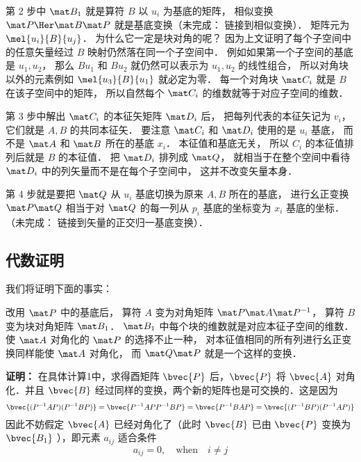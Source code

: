 第 2 步中 $\mat B_1$ 就是算符 $B$ 以 $u_i$ 为基底的矩阵， 相似变换 $\mat P\Her \mat B\mat P$ 就是基底变换（未完成： 链接到相似变换）． 矩阵元为 $\mel{u_i}{B}{u_j}$． 为什么它一定是块对角的呢？ 因为上文证明了每个子空间中的任意矢量经过 $B$ 映射仍然落在同一个子空间中． 例如如果第一个子空间的基底是 $u_1, u_2$， 那么 $B u_1$ 和 $B u_2$ 就仍然可以表示为 $u_1, u_2$ 的线性组合， 所以对角块以外的元素例如 $\mel{u_3}{B}{u_1}$ 就必定为零． 每一个对角块 $\mat C_i$ 就是 $B$ 在该子空间中的矩阵， 所以自然每个 $\mat C_i$ 的维数就等于对应子空间的维数．

第 3 步中解出 $\mat C_i$ 的本征矢矩阵 $\mat D_i$ 后， 把每列代表的本征矢记为 $v_i$， 它们就是 $A, B$ 的共同本征矢． 要注意 $\mat C_i$ 和 $\mat D_i$ 使用的是 $u_i$ 基底， 而不是 $\mat A$ 和 $\mat B$ 所在的基底 $x_i$． 本征值和基底无关， 所以 $C_i$ 的本征值排列后就是 $B$ 的本征值． 把 $\mat D_i$ 排列成 $\mat Q$， 就相当于在整个空间中看待 $\mat D_i$ 中的列矢量而不是在每个子空间中， 这并不改变矢量本身．

第 4 步就是要把 $\mat Q$ 从 $u_i$ 基底切换为原来 $A, B$ 所在的基底， 进行幺正变换 $\mat P\mat Q$ 相当于对 $\mat Q$ 的每一列从 $p_i$ 基底的坐标变为 $x_i$ 基底的坐标．（未完成： 链接到矢量的正交归一基底变换）．


\subsection{代数证明}
我们将证明下面的事实：

改用 $\mat P$ 中的基底后， 算符 $A$ 变为对角矩阵 $\mat P \mat A\mat P^{-1}$， 算符 $B$ 变为块对角矩阵 $\mat B_1$． $\mat B_1$ 中每个块的维数就是对应本征子空间的维数． 使 $\mat A$ 对角化的 $\mat P$ 的选择不止一种， 对本征值相同的所有列进行幺正变换同样能使 $\mat A$ 对角化， 而 $\mat Q\mat P$ 就是一个这样的变换．

\textbf{证明：}
在具体计算1中，求得酉矩阵 $\bvec{P}$ 后，$\bvec{P}$ 将 $\bvec{A}$ 对角化．并且 $\bvec{B}$ 经过同样的变换，两个新的矩阵也是可交换的．这是因为
\begin{equation}
\bvec{(P^{-1}AP)(P^{-1}BP)}=\bvec{P^{-1}APP^{-1}BP}=\bvec{P^{-1}BAP}=\bvec{(P^{-1}BP)(P^{-1}AP)}
\end{equation}
因此不妨假定 $\bvec{A}$ 已经对角化了（此时 $\bvec{B}$ 已由 $\bvec{P}$ 变换为 $\bvec{B_1}$ ），即元素 $a_{ij}$ 适合条件
\begin{equation}
a_{ij}=0,\quad \mathrm{when} \quad i\neq j
\label{Commut_eq25}
\end{equation}

